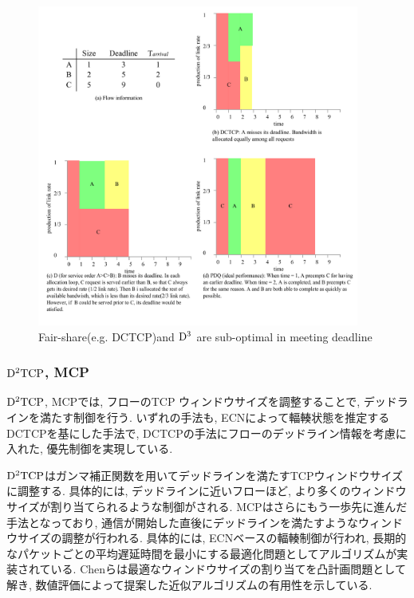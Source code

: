 \begin{figure}[t]
    \begin{center}
    \includegraphics[autoebb, width=300pt]{./img/fair_share.pdf}
    \caption{Fair-share(e.g. DCTCP)and ${\rm D^3}$ are sub-optimal in meeting
    deadline}
    \label{fig:fair_share}
    \end{center}
\end{figure}

\subsubsection{${\rm D^{2}TCP}$, MCP}
$ {\rm D^{2}TCP}$\cite{d2tcp}, MCP\cite{mcp}では, フローのTCP ウィンドウサイズを調整することで,
デッドラインを満たす制御を行う.
いずれの手法も, ECNによって輻輳状態を推定するDCTCP\cite{dctcp}を基にした手法で,
DCTCPの手法にフローのデッドライン情報を考慮に入れた, 優先制御を実現している. 

${\rm D^{2}TCP}$はガンマ補正関数を用いてデッドラインを満たすTCPウィンドウサイズに調整する. 
具体的には, デッドラインに近いフローほど, より多くのウィンドウサイズが割り当てられるような制御がされる. 
MCP\cite{mcp}はさらにもう一歩先に進んだ手法となっており, 通信が開始した直後にデッドラインを満たすようなウィンドウサイズの調整が行われる. 
具体的には, ECNベースの輻輳制御が行われ, 長期的なパケットごとの平均遅延時間を最小にする最適化問題としてアルゴリズムが実装されている. 
Chenら\cite{mcp}は最適なウィンドウサイズの割り当てを凸計画問題として解き, 数値評価によって提案した近似アルゴリズムの有用性を示している. 


